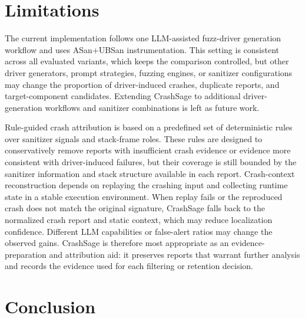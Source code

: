 \documentclass[pdflatex,sn-basic]{sn-jnl}%
\theoremstyle{thmstyleone}%
\theoremstyle{thmstyletwo}%
\theoremstyle{thmstylethree}%
\begin{document}
\FloatBarrier

\section{Limitations}
\label{sec:limitations}

The current implementation follows one LLM-assisted fuzz-driver generation workflow and uses ASan+UBSan instrumentation. This setting is consistent across all evaluated variants, which keeps the comparison controlled, but other driver generators, prompt strategies, fuzzing engines, or sanitizer configurations may change the proportion of driver-induced crashes, duplicate reports, and target-component candidates. Extending CrashSage to additional driver-generation workflows and sanitizer combinations is left as future work.

Rule-guided crash attribution is based on a predefined set of deterministic rules over sanitizer signals and stack-frame roles. These rules are designed to conservatively remove reports with insufficient crash evidence or evidence more consistent with driver-induced failures, but their coverage is still bounded by the sanitizer information and stack structure available in each report. Crash-context reconstruction depends on replaying the crashing input and collecting runtime state in a stable execution environment. When replay fails or the reproduced crash does not match the original signature, CrashSage falls back to the normalized crash report and static context, which may reduce localization confidence. Different LLM capabilities or false-alert ratios may change the observed gains. CrashSage is therefore most appropriate as an evidence-preparation and attribution aid: it preserves reports that warrant further analysis and records the evidence used for each filtering or retention decision.

\FloatBarrier

\section{Conclusion}
\label{sec:conclusion}
\end{document}
